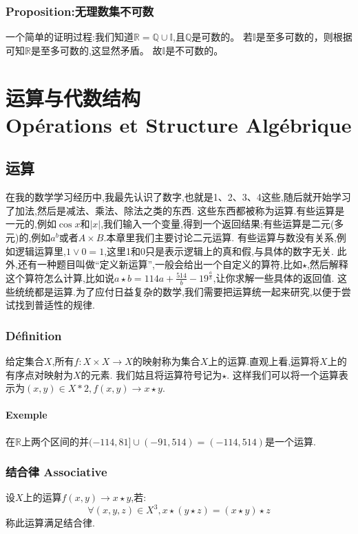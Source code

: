 \documentclass[12pt, a4paper, oneside]{ctexbook}
\begin{document}
  \subsection{Proposition:无理数集不可数}
  一个简单的证明过程:我们知道$\mathbb{R}=\mathbb{Q}\cup\mathbb{I}$,且$\mathbb{Q}$是可数的。
  若$\mathbb{I}$是至多可数的，则根据可知$\mathbb{R}$是至多可数的,这显然矛盾。
  故$\mathbb{I}$是不可数的。



\chapter{运算与代数结构\\ Opérations et Structure Algébrique}
  
  \section{运算}
  在我的数学学习经历中,我最先认识了数字,也就是1、2、3、4这些,随后就开始学习了加法,然后是减法、乘法、除法之类的东西.
  这些东西都被称为运算.有些运算是一元的,例如$\cos x$和$|x|$,我们输入一个变量,得到一个返回结果;有些运算是二元(多元)的,例如$a^b$或者$A \times B$.本章里我们主要讨论二元运算.
  有些运算与数没有关系,例如逻辑运算里,$1\vee 0=1$,这里1和0只是表示逻辑上的真和假,与具体的数字无关.
  此外,还有一种题目叫做“定义新运算”,一般会给出一个自定义的算符,比如$\star $,然后解释这个算符怎么计算,比如说$a\star b=114a+\frac{514}{b}-19^{\frac{a}{b}}$,让你求解一些具体的返回值.
  这些统统都是运算.为了应付日益复杂的数学,我们需要把运算统一起来研究,以便于尝试找到普适性的规律.\label{myref:传统运算}
  \subsection{Définition}
  给定集合$X$,所有$f:X\times X\rightarrow X$的映射称为集合$X$上的运算.直观上看,运算将$X$上的有序点对映射为$X$的元素.
  我们姑且将运算符号记为$\star $.
  这样我们可以将一个运算表示为$(x,y)\in X*2,f(x,y)\rightarrow x\star y$.
  \subsubsection{Exemple}
  在$\mathbb{R}$上两个区间的并$(-114,81]\cup (-91,514)=(-114,514)$是一个运算.
  \subsection{结合律 Associative}
  设$X$上的运算$f(x,y)\rightarrow x\star y $,若:
  $$
  \forall (x,y,z)\in X^3, x\star(y\star z)=(x\star y)\star z
  $$
  称此运算满足结合律.
\end{document}
